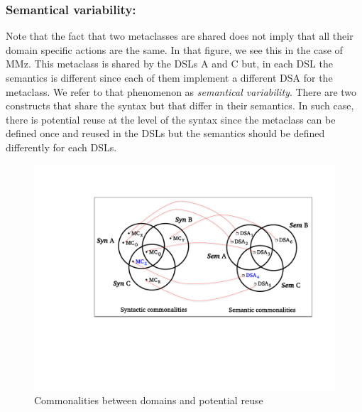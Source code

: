 \vspace{-3mm}
\subsubsection{Semantical variability:} Note that the fact that two metaclasses are shared does not imply that all their domain specific actions are the same. In that figure, we see this in the case of MMz. This metaclass is shared by the DSLs A and C but, in each DSL the semantics is different since each of them implement a different DSA for the metaclass. We refer to that phenomenon as \textit{semantical variability}. There are two constructs that share the syntax but that differ in their semantics. In such case, there is potential reuse at the level of the syntax since the metaclass can be defined once and reused in the DSLs but the semantics should be defined differently for each DSLs. 


\begin{figure}
\centering
\includegraphics[width=1\linewidth]{images/domains-fig.pdf}
\caption{Commonalities between domains and potential reuse}
\label{fig:domains}
\end{figure}



